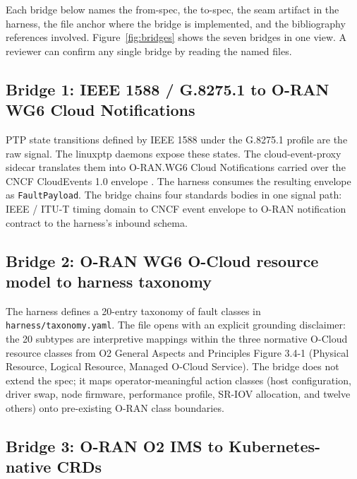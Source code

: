 \documentclass[twocolumn,10pt,a4paper]{article}
\begin{document}
Each bridge below names the from-spec, the to-spec, the seam artifact in the harness, the file anchor where the bridge is implemented, and the bibliography references involved. Figure~\ref{fig:bridges} shows the seven bridges in one view. A reviewer can confirm any single bridge by reading the named files.

\subsection{Bridge 1: IEEE 1588 / G.8275.1 to O-RAN WG6 Cloud Notifications}

PTP state transitions defined by IEEE 1588 \cite{ieee_1588_2019} under the G.8275.1 profile \cite{itu_g82751} are the raw signal. The linuxptp daemons \cite{linuxptp_ptp4l} expose these states. The cloud-event-proxy sidecar \cite{cloud_event_proxy} translates them into O-RAN.WG6 Cloud Notifications \cite{oran_cloud_notifications} carried over the CNCF CloudEvents 1.0 envelope \cite{cncf_cloudevents}. The harness consumes the resulting envelope as \texttt{FaultPayload}. The bridge chains four standards bodies in one signal path: IEEE / ITU-T timing domain to CNCF event envelope to O-RAN notification contract to the harness's inbound schema.

\subsection{Bridge 2: O-RAN WG6 O-Cloud resource model to harness taxonomy}

The harness defines a 20-entry taxonomy of fault classes in \texttt{harness/taxonomy.yaml}. The file opens with an explicit grounding disclaimer: the 20 subtypes are interpretive mappings within the three normative O-Cloud resource classes from O2 General Aspects and Principles Figure 3.4-1 \cite{oran_o2_ganp} (Physical Resource, Logical Resource, Managed O-Cloud Service). The bridge does not extend the spec; it maps operator-meaningful action classes (host configuration, driver swap, node firmware, performance profile, SR-IOV allocation, and twelve others) onto pre-existing O-RAN class boundaries.

\subsection{Bridge 3: O-RAN O2 IMS to Kubernetes-native CRDs}
\end{document}
